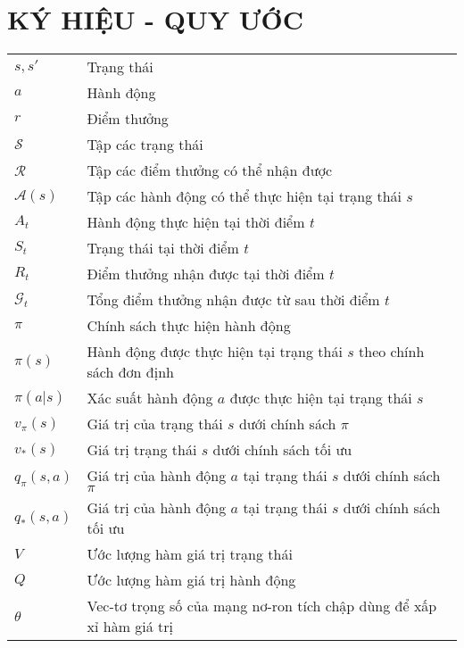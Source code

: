 \chapter*{KÝ HIỆU - QUY ƯỚC}
\begin{tabular}{ l l }
	$s, s'$ & Trạng thái\\
	$a$ & Hành động\\
	$r$ & Điểm thưởng\\
	$\mathcal{S}$ & Tập các trạng thái\\
	$\mathcal{R}$ & Tập các điểm thưởng có thể nhận được\\
	$\mathcal{A}(s)$ & Tập các hành động có thể thực hiện tại trạng thái $s$\\
	$\mathit{A}_{t}$ & Hành động thực hiện tại thời điểm $t$\\
	$\mathit{S}_{t}$ & Trạng thái tại thời điểm $t$\\
	$\mathit{R}_{t}$ & Điểm thưởng nhận được tại thời điểm $t$\\
	$\mathcal{G}_{t}$ & Tổng điểm thưởng nhận được từ sau thời điểm $t$\\
	$\pi$ & Chính sách thực hiện hành động\\
	$\pi(s)$ & Hành động được thực hiện tại trạng thái $s$ theo chính sách đơn định\\
	$\pi(a|s)$ & Xác suất hành động $a$ được thực hiện tại trạng thái $s$\\
	$v_{\pi}(s)$ & Giá trị của trạng thái $s$ dưới chính sách $\pi$ \\
	$v_{*}(s)$ & Giá trị trạng thái $s$ dưới chính sách tối ưu \\
	$q_{\pi}(s,a)$ & Giá trị của hành động $a$ tại trạng thái $s$ dưới chính sách $\pi$\\
	$q_{*}(s,a)$ & Giá trị của hành động $a$ tại trạng thái $s$ dưới chính sách tối ưu\\
	$V$ & Ước lượng hàm giá trị trạng thái\\
	$Q$ & Ước lượng hàm giá trị hành động\\
	$\theta$ & Vec-tơ trọng số của mạng nơ-ron tích chập dùng để xấp xỉ hàm giá trị
\end{tabular}